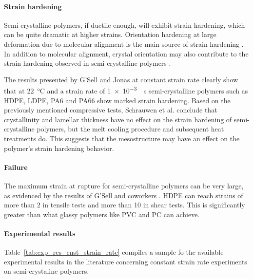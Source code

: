 \paragraph{Strain hardening}
Semi-crystalline polymers, if ductile enough, will exhibit strain hardening, which can be quite dramatic at higher strains.
Orientation hardening at large deformation due to molecular alignment is the main source of strain hardening \citep{ahziModelingDeformationBehavior2003}.
In addition to molecular alignment, crystal orientation may also contribute to the strain hardening observed in semi-crystalline polymers \citep{abdul-hameedTwophaseHyperelasticviscoplasticConstitutive2014}.

The results presented by G'Sell and Jonas \citep{gsellYieldTransientEffects1981} at constant strain rate clearly show that at \SI{22}{\celsius} and a strain rate of \SI{1e-3}{\per\second} semi-crystalline polymers such as HDPE, LDPE, PA6 and PA66 show marked strain hardening.
Based on the previously mentioned compressive tests, Schrauwen et al. \citep{schrauwenIntrinsicDeformationBehavior2004} conclude that crystallinity and lamellar thickness have no effect on the strain hardening of semi-crystalline polymers, but the melt cooling procedure and subsequent heat treatments do.
This suggests that the mesostructure may have an effect on the polymer's strain hardening behavior.

\paragraph{Failure}
The maximum strain at rupture for semi-crystalline polymers can be very large, as evidenced by the results of G'Sell and coworkers \citep{gsellYieldTransientEffects1981, gsellApplicationPlaneSimple1983}.
HDPE can reach strains of more than 2 in tensile tests and more than 10 in shear tests.
This is significantly greater than what glassy polymers like PVC and PC can achieve.

\paragraph{Experimental results}

Table~\ref{tab:exp_res_cnst_strain_rate} compiles a sample fo the available experimental results in the literature concerning constant strain rate experiments on semi-crystaline polymers.

